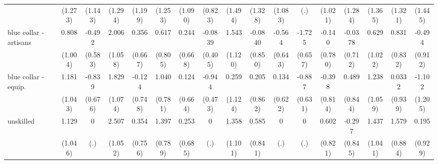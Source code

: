 {\begin{tabular}{l*{16}{c}}
                    &     (1.273)         &     (1.143)         &     (1.294)         &     (1.199)         &     (1.253)         &     (1.090)         &     (0.823)         &     (1.494)         &     (1.328)         &     (1.083)         &         (.)         &     (1.021)         &     (1.284)         &     (1.365)         &     (1.321)         &     (1.445)         \\
[1em]
blue collar - artisans&       0.808         &      -0.492         &       2.006         &       0.356         &       0.617         &       0.244         &     -0.0839         &       1.543         &     -0.0840         &      -0.564         &      -1.725\sym{**} &      -0.140         &     -0.0378         &       0.629         &       0.831         &      -0.494         \\
                    &     (1.004)         &     (0.583)         &     (1.058)         &     (0.667)         &     (0.805)         &     (0.668)         &     (0.405)         &     (1.120)         &     (0.850)         &     (0.643)         &     (0.657)         &     (0.780)         &     (0.712)         &     (1.022)         &     (0.832)         &     (0.912)         \\
[1em]
blue collar - equip.&       1.181         &      -0.839         &       1.829         &      -0.124         &       1.040         &       0.124         &      -0.944\sym{*}  &       0.259         &       0.205         &       0.134         &      -0.887         &      -0.398         &       0.489         &       1.238         &      0.0332         &      -1.102         \\
                    &     (1.043)         &     (0.676)         &     (1.074)         &     (0.748)         &     (0.781)         &     (0.664)         &     (0.473)         &     (1.124)         &     (0.862)         &     (0.622)         &     (0.631)         &     (0.814)         &     (0.844)         &     (1.059)         &     (0.939)         &     (1.205)         \\
[1em]
unskilled           &       1.129         &           0         &       2.507\sym{*}  &       0.354         &       1.397         &       0.253         &           0         &       1.358         &       0.585         &           0         &           0         &       0.602         &      -0.297         &       1.437         &       1.579         &       0.195         \\
                    &     (1.046)         &         (.)         &     (1.052)         &     (0.756)         &     (0.789)         &     (0.685)         &         (.)         &     (1.101)         &     (0.841)         &         (.)         &         (.)         &     (0.821)         &     (0.845)         &     (1.041)         &     (0.884)         &     (0.929)         \\

\end{tabular}}
